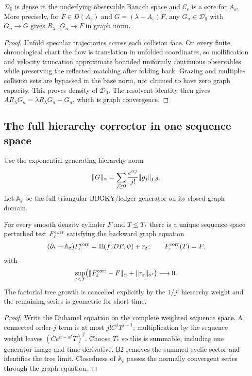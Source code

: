 \begin{theorem}
\label{thm:r12-b4-core}
$\mathscr D_0$ is dense in the underlying observable Banach space and
$\mathscr C_\varepsilon$ is a core for $A_\varepsilon$.  More precisely, for
$F\in D(A_\varepsilon)$ and
$G=(\lambda-A_\varepsilon)F$, any
$G_n\in\mathscr D_0$ with $G_n\to G$ gives
$R_{\lambda,\varepsilon}G_n\to F$ in graph norm.
\end{theorem}

\begin{proof}
Unfold specular trajectories across each collision face.  On every finite
chronological chart the flow is translation in unfolded coordinates, so
mollification and velocity truncation approximate bounded uniformly
continuous observables while preserving the reflected matching after folding
back.  Grazing and multiple-collision sets are bypassed in the base norm,
not claimed to have zero graph capacity.  This proves density of
$\mathscr D_0$.  The resolvent identity then gives
$A R_\lambda G_n=\lambda R_\lambda G_n-G_n$, which is graph convergence.
\end{proof}

\subsection{The full hierarchy corrector in one sequence space}

Use the exponential generating hierarchy norm
\[
 \|G\|_{\alpha}
 =\sum_{j\ge0}{e^{\alpha j}\over j!}\|g_j\|_{j,\beta}.
\]
Let $\mathbb A_\varepsilon$ be the full triangular BBGKY/ledger generator on
its closed graph domain.

\begin{theorem}
\label{thm:r12-b4-corrector}
For every smooth density cylinder $F$ and $T\le T_*$ there is a unique
sequence-space perturbed test $F_\varepsilon^{\rm corr}$ satisfying the
backward graph equation
\[
 (\partial_t+\mathbb A_\varepsilon)
 F_\varepsilon^{\rm corr}
 =\mathbb H(f,DF,\psi)+r_\varepsilon,
 \qquad F_\varepsilon^{\rm corr}(T)=F,
\]
with
\[
 \sup_{t\le T}
 \bigl(\|F_\varepsilon^{\rm corr}-F\|_\alpha
      +\|r_\varepsilon\|_{\alpha'}\bigr)\longrightarrow0.
\]
The factorial tree growth is cancelled explicitly by the $1/j!$ hierarchy
weight and the remaining series is geometric for short time.
\end{theorem}

\begin{proof}
Write the Duhamel equation on the complete weighted sequence space.  A
connected order-$j$ term is at most $j!C^jT^{j-1}$; multiplication by the
sequence weight leaves $(Ce^{\alpha-\alpha'}T)^j$.  Choose $T_*$ so this is
summable, including one generator image and time derivative.  B2 removes the
summed cyclic sector and identifies the tree limit.  Closedness of
$\mathbb A_\varepsilon$ passes the normally convergent series through the
graph equation.
\end{proof}

